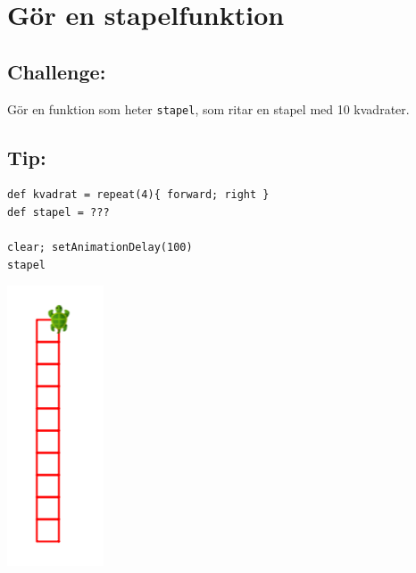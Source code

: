 \chapter{Gör en stapelfunktion}
\begin{multicols}{2}
\section*{\color{BrickRed}Challenge:}
Gör en funktion som heter \lstinline{stapel}, som ritar en stapel med 10 kvadrater.
\section*{\color{OliveGreen}Tip:}

\begin{lstlisting}[numbers=none]
def kvadrat = repeat(4){ forward; right }  
def stapel = ???

clear; setAnimationDelay(100)
stapel
\end{lstlisting}
        

\columnbreak

\begin{center}
\includegraphics{../img/square-column.png}
\end{center}

\end{multicols}

